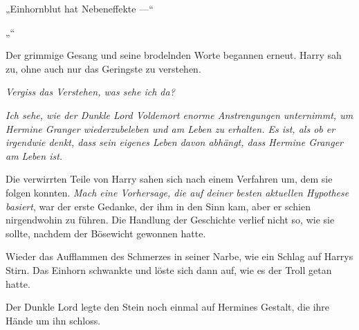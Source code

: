 „Einhornblut hat Nebeneffekte —“

„“

Der grimmige Gesang und seine brodelnden Worte begannen erneut.
Harry sah zu, ohne auch nur das Geringste zu verstehen.

\emph{Vergiss das Verstehen, was sehe ich da?}

\emph{Ich sehe, wie der Dunkle Lord Voldemort enorme Anstrengungen unternimmt, um Hermine Granger wiederzubeleben und am Leben zu erhalten. Es ist, als ob er irgendwie denkt, dass sein eigenes Leben davon abhängt, dass Hermine Granger am Leben ist.}

Die verwirrten Teile von Harry sahen sich nach einem Verfahren um, dem sie folgen konnten. \emph{Mach eine Vorhersage, die auf deiner besten aktuellen Hypothese basiert}, war der erste Gedanke, der ihm in den Sinn kam, aber er schien nirgendwohin zu führen. Die Handlung der Geschichte verlief nicht so, wie sie sollte, nachdem der Bösewicht gewonnen hatte.

Wieder das Aufflammen des Schmerzes in seiner Narbe, wie ein Schlag auf Harrys Stirn. Das Einhorn schwankte und löste sich dann auf, wie es der Troll getan hatte.

Der Dunkle Lord legte den Stein noch einmal auf Hermines Gestalt, die ihre Hände um ihn schloss.

